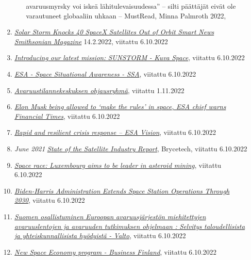 \begin{enumerate}
\begin{itemize}
{{    avaruusmyrsky voi iskeä lähitulevaisuudessa'' -- silti päättäjät
    eivät ole varautuneet globaaliin uhkaan -- MustRead}}, Minna
    Palmroth 2022,
  \end{itemize}
\item
  \href{https://www.smithsonianmag.com/smart-news/solar-storm-knocks-40-spacex-satellites-out-of-orbit-180979566/}{\emph{Solar
  Storm Knocks 40 SpaceX Satellites Out of Orbit \textbar{} Smart
  News\textbar{} Smithsonian Magazine}} 14.2.2022, viitattu 6.10.2022
\item
  \href{https://kuvaspace.com/2019/06/04/introducing-our-latest-mission-sunstorm/}{\emph{Introducing
  our latest mission: SUNSTORM - Kuva Space}}, viitattu 6.10.2022
\item
  \href{https://www.esa.int/About_Us/ESAC/Space_Situational_Awareness_-_SSA}{\emph{ESA
  - Space Situational Awareness - SSA}}, viitattu 6.10.2022
\item
  \href{https://valtioneuvosto.fi/hanke?tunnus=LVM035:00/2022}{\emph{Avaruustilannekeskuksen
  ohjausryhmä}}, viitattu 1.11.2022
\item
  \href{https://www.ft.com/content/7d561078-37c7-4902-a094-637b81a26241}{\emph{Elon
  Musk being allowed to `make the rules' in space, ESA chief warns
  \textbar{} Financial Times}}, viitattu 6.10.2022
\item
  \href{https://vision.esa.int/rapid-and-resilient-crisis-response/}{\emph{Rapid
  and resilient crisis response -- ESA Vision}}, viitattu 6.10.2022
\item
  \emph{June 2021
  }\href{https://brycetech.com/reports/report-documents/SIA_SSIR_2021.pdf}{\emph{State
  of the Satellite Industry Report}}, Brycetech, viitattu 6.10.2022
\item
  \href{https://miningglobal.com/supply-chain-and-operations/space-race-luxembourg-aims-be-leader-asteroid-mining}{\emph{Space
  race: Luxembourg aims to be leader in asteroid mining}}, viitattu
  6.10.2022
\item
  \href{https://blogs.nasa.gov/spacestation/2021/12/31/biden-harris-administration-extends-space-station-operations-through-2030/}{\emph{Biden-Harris
  Administration Extends Space Station Operations Through 2030}},
  viitattu 6.10.2022
\item
  \href{https://urn.fi/URN:ISBN:978-952-327-704-5}{\emph{Suomen
  osallistuminen Euroopan avaruusjärjestön miehitettyjen avaruuslentojen
  ja avaruuden tutkimuksen ohjelmaan : Selvitys taloudellisista ja
  yhteiskunnallisista hyödyistä - Valto}}, viitattu 6.10.2022
\item
  \href{https://www.businessfinland.fi/en/for-finnish-customers/services/programs/new-space-economy}{\emph{New
  Space Economy program - Business Finland}}, viitattu 6.10.2022
\end{enumerate}

